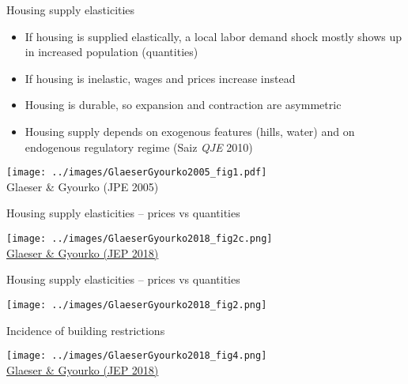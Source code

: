 \documentclass[11pt,notes=hide,aspectratio=169]{beamer}
\begin{document}
\begin{frame}{Housing supply elasticities}
\begin{itemize}
	\item If housing is supplied elastically, a local labor demand shock mostly shows up in increased population (quantities)
	\item If housing is inelastic, wages and prices increase instead
	\item Housing is durable, so expansion and contraction are asymmetric
	\item Housing supply depends on exogenous features (hills, water) and on endogenous regulatory regime (Saiz \textit{QJE} 2010)
\end{itemize}
\begin{center}
\texttt{[image: ../images/GlaeserGyourko2005\_fig1.pdf]}\\
\vspace{-2mm}
{\small Glaeser \& Gyourko (JPE 2005)}
\end{center}
\end{frame}
\begin{frame}{Housing supply elasticities -- prices vs quantities}
\begin{center}
\texttt{[image: ../images/GlaeserGyourko2018\_fig2c.png]}\\
\href{https://www.aeaweb.org/articles?id=10.1257/jep.32.1.3}{Glaeser \& Gyourko (JEP 2018)}\end{center}
\end{frame}
\begin{frame}{Housing supply elasticities -- prices vs quantities}
\begin{center}
\texttt{[image: ../images/GlaeserGyourko2018\_fig2.png]}
\end{center}
\end{frame}
\begin{frame}{Incidence of building restrictions}
\begin{center}
\texttt{[image: ../images/GlaeserGyourko2018\_fig4.png]}\\
\href{https://www.aeaweb.org/articles?id=10.1257/jep.32.1.3}{Glaeser \& Gyourko (JEP 2018)}
\end{center}
\end{frame}
\end{document}
